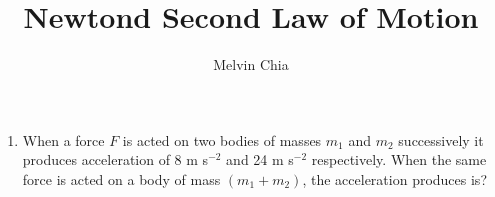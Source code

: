 \documentclass{report}
\title{Newtond Second Law of Motion}
\author{Melvin Chia}
\begin{document}
\maketitle

\begin{enumerate}
    \item When a force $F$ is acted on two bodies of masses $m_1$ and $m_2$ successively
          it produces acceleration of 8 m s$^{-2}$ and 24 m s$^{-2}$ respectively. When
          the same force is acted on a body of mass $(m_1 + m_2)$, the acceleration
          produces is?
\end{enumerate}
\end{document}
